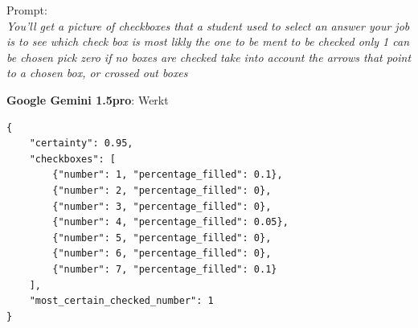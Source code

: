 \documentclass[12pt]{article}
\begin{document}
\begin{multicols}{2}
Prompt:\\
\textit{You'll get a picture of checkboxes that a student used to select an answer
    your job is to see which check box is most likly the one to be ment to be checked
    only 1 can be chosen
    pick zero if no boxes are checked 
    take into account the arrows that point to a chosen box, or crossed out boxes}


\end{multicols}
\pagebreak
\textbf{Google Gemini 1.5pro}: Werkt
\begin{listing}[H]
    
    \begin{verbatim}
{
    "certainty": 0.95, 
    "checkboxes": [
        {"number": 1, "percentage_filled": 0.1}, 
        {"number": 2, "percentage_filled": 0}, 
        {"number": 3, "percentage_filled": 0}, 
        {"number": 4, "percentage_filled": 0.05}, 
        {"number": 5, "percentage_filled": 0}, 
        {"number": 6, "percentage_filled": 0}, 
        {"number": 7, "percentage_filled": 0.1}
    ], 
    "most_certain_checked_number": 1
}
        \end{verbatim}
\end{listing}
\pagebreak
\end{document}
